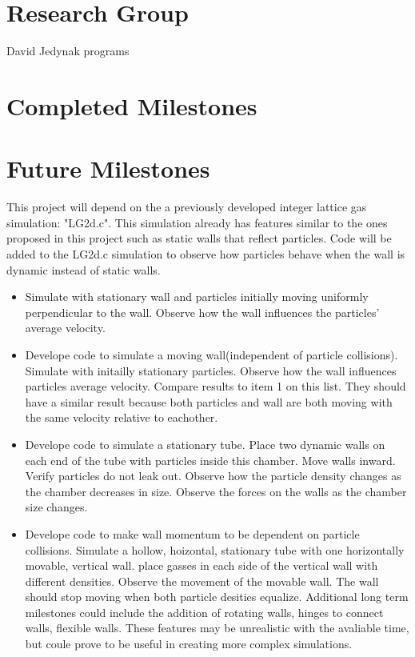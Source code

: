\documentclass{article}
\begin{document}
\section{Research Group}
David Jedynak programs 
\section{Completed Milestones}

\section{Future Milestones}
This project will depend on the a previously developed integer lattice gas simulation: "LG2d.c". This simulation already has features similar to the ones proposed in this project such as static walls that reflect particles. Code will be added to the LG2d.c simulation to observe how particles behave when the wall is dynamic instead of static walls. 
\begin{itemize}
  \item Simulate with stationary wall and particles initially moving uniformly perpendicular to the wall. Observe how the wall influences the particles' average velocity.  
  \item Develope code to simulate a moving wall(independent of particle collisions). Simulate with initailly stationary particles. Observe how the wall influences particles average velocity. Compare results to item 1 on this list. They should have a similar result because both particles and wall are both moving with the same velocity relative to eachother.
  \item Develope code to simulate a stationary tube. Place two dynamic walls on each end of the tube with particles inside this chamber. Move walls inward. Verify particles do not leak out. Observe how the particle density changes as the chamber decreases in size. Observe the forces on the walls as the chamber size changes.
  \item Develope code to make wall momentum to be dependent on particle collisions. Simulate a hollow, hoizontal, stationary tube with one horizontally movable, vertical wall. place gasses in each side of the vertical wall with different densities. Observe the movement of the movable wall. The wall should stop moving when both particle desities equalize.\newline
\vspace{5mm}\newline
Additional long term milestones could include the addition of rotating walls, hinges to connect walls, flexible walls. These features may be unrealistic with the avaliable time, but coule prove to be useful in creating more complex simulations.
\end{itemize}
\end{document}

